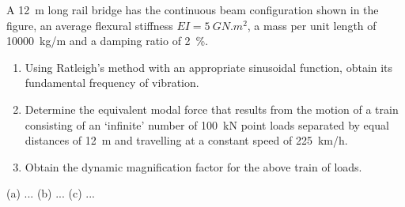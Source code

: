 
\begin{Exercise}[label=rail_bridge]
A \SI{12}{m} long rail bridge has the continuous beam configuration shown in the figure, an average flexural stiffness $EI=\SI{5}{GN.m^2}$, a mass per unit length of \SI{10000}{kg/m} and a damping ratio of \SI{2}{\%}.
\begin{enumerate}
    \item Using Ratleigh's method with an appropriate sinusoidal function, obtain its fundamental frequency of vibration.
    \item Determine the equivalent modal force that results from the motion of a train consisting of an `infinite' number of \SI{100}{kN} point loads separated by equal distances of \SI{12}{m} and travelling at a constant speed of \SI{225}{km/h}.
    \item Obtain the dynamic magnification factor for the above train of loads.
\end{enumerate}

\begin{center}
\end{center}

\shortAnswer (a) ... (b) ... (c) ...
\end{Exercise}


\begin{Answer}[ref=rail_bridge]

\end{Answer}